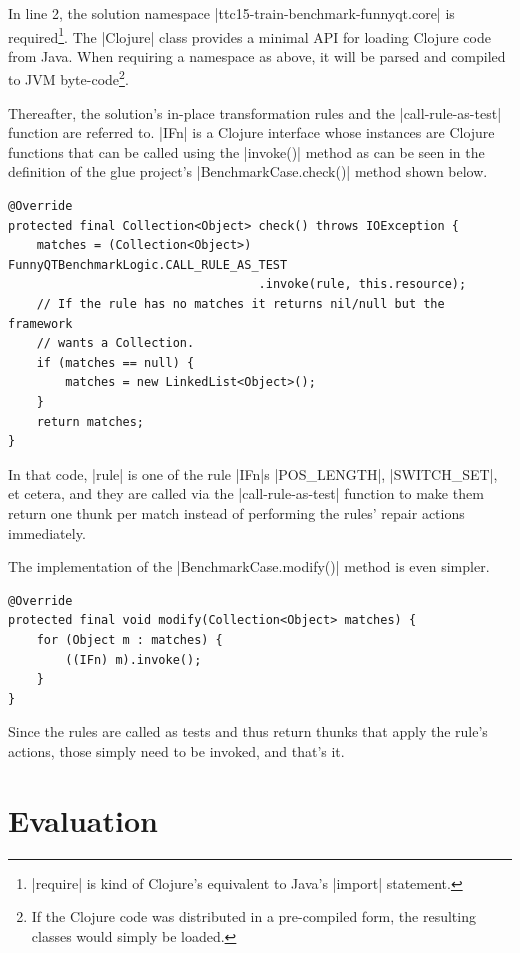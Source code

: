 \documentclass[submission]{eptcs}
\newcommand{\code}{\clojureinline}
\begin{document}
In line 2, the solution namespace \code|ttc15-train-benchmark-funnyqt.core| is
required\footnote{\code|require| is kind of Clojure's equivalent to Java's
  \code|import| statement.}.  The \code|Clojure| class provides a minimal API
for loading Clojure code from Java.  When requiring a namespace as above, it
will be parsed and compiled to JVM byte-code\footnote{If the Clojure code was
  distributed in a pre-compiled form, the resulting classes would simply be
  loaded.}.

Thereafter, the solution's in-place transformation rules and the
\code|call-rule-as-test| function are referred to.  \code|IFn| is a Clojure
interface whose instances are Clojure functions that can be called using the
\code|invoke()| method as can be seen in the definition of the glue project's
\code|BenchmarkCase.check()| method shown below.

\begin{verbatim}
@Override
protected final Collection<Object> check() throws IOException {
    matches = (Collection<Object>) FunnyQTBenchmarkLogic.CALL_RULE_AS_TEST
                                   .invoke(rule, this.resource);
    // If the rule has no matches it returns nil/null but the framework
    // wants a Collection.
    if (matches == null) {
        matches = new LinkedList<Object>();
    }
    return matches;
}
\end{verbatim}

In that code, \code|rule| is one of the rule \code|IFn|s \code|POS_LENGTH|,
\code|SWITCH_SET|, et cetera, and they are called via the
\code|call-rule-as-test| function to make them return one thunk per match
instead of performing the rules' repair actions immediately.

The implementation of the \code|BenchmarkCase.modify()| method is even simpler.

\begin{verbatim}
@Override
protected final void modify(Collection<Object> matches) {
    for (Object m : matches) {
        ((IFn) m).invoke();
    }
}
\end{verbatim}

Since the rules are called as tests and thus return thunks that apply the
rule's actions, those simply need to be invoked, and that's it.



\section{Evaluation}
\label{sec:evaluation}
\end{document}

